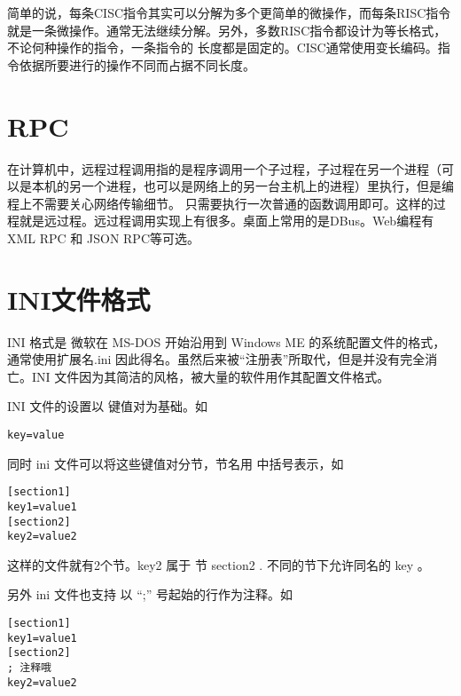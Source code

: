 简单的说，每条CISC指令其实可以分解为多个更简单的微操作，而每条RISC指令就是一条微操作。通常无法继续分解。另外，多数RISC指令都设计为等长格式，不论何种操作的指令，一条指令的
长度都是固定的。CISC通常使用变长编码。指令依据所要进行的操作不同而占据不同长度。

\section{RPC}\label{FAQ:RPC}

在计算机中，远程过程调用指的是程序调用一个子过程，子过程在另一个进程（可以是本机的另一个进程，也可以是网络上的另一台主机上的进程）里执行，但是编程上不需要关心网络传输细节。
只需要执行一次普通的函数调用即可。这样的过程就是远过程。远过程调用实现上有很多。桌面上常用的是DBus。Web编程有XML RPC 和 JSON RPC等可选。

\section{INI文件格式}\label{FAQ:INI}

INI 格式是 微软在 MS-DOS 开始沿用到 Windows ME 的系统配置文件的格式，通常使用扩展名.ini 因此得名。虽然后来被“注册表”所取代，但是并没有完全消亡。INI 文件因为其简洁的风格，被大量的软件用作其配置文件格式。

INI 文件的设置以 键值对为基础。如

\begin{verbatim}
key=value
\end{verbatim}

同时 ini 文件可以将这些键值对分节，节名用 中括号表示，如

\begin{verbatim}
[section1]
key1=value1
[section2]
key2=value2
\end{verbatim}

这样的文件就有2个节。key2 属于 节 section2 . 不同的节下允许同名的 key 。


另外 ini 文件也支持 以 “;” 号起始的行作为注释。如


\begin{verbatim}
[section1]
key1=value1
[section2]
; 注释哦
key2=value2
\end{verbatim}

